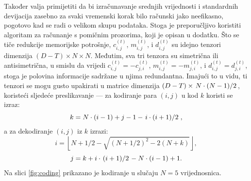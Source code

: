 \documentclass[lmodern, utf8, diplomski, numeric]{fer}
\begin{document}
  Također valja primijetiti da bi izračunavanje srednjih vrijednosti i standardnih devijacija zasebno za svaki vremenski korak bilo računski jako neefikasno, pogotovo kad se radi o velikom skupu podataka.
  Stoga je preporučljivo koristiti algoritam za računanje s pomičnim prozorima, koji je opisan u dodatku.
  Što se tiče redukcije memorijske potrošnje, $c_{i,j}^{\left(t\right)}$, $m_{i,j}^{\left(t\right)}$, i $d_{i,j}^{\left(t\right)}$ su idejno tenzori dimenzija $(D - T) \times N \times N$.
  Međutim, sva tri tenzora su simetrična ili antisimetrična, u smislu da vrijedi $c_{i,j}^{\left(t\right)} = -c_{j,i}^{\left(t\right)}$, $m_{i,j}^{\left(t\right)} = -m_{j,i}^{\left(t\right)}$, i $d_{i,j}^{\left(t\right)} = d_{j,i}^{\left(t\right)}$, stoga je polovina informacije sadržane u njima redundantna.
  Imajući to u vidu, ti tenzori se mogu gusto upakirati u matrice dimenzija $(D - T) \times \left. N\cdot(N - 1) \middle/ 2\right.$, koristeći sljedeće preslikavanje --- za kodiranje para $(i,j)$ u kod $k$ koristi se izraz:
  \begin{equation} k = N \cdot (i - 1) + j - 1 - \left. i \cdot (i + 1) \middle/ 2\right., \end{equation}
  a za dekodiranje $(i, j)$ iz $k$ izrazi:
  \begin{equation} i = \left\lfloor N + 1/2 - \sqrt{(N + 1/2)^2 - 2(N + k)} \right\rfloor, \end{equation}
  \begin{equation} j = k + i \cdot \left.(i + 1) \middle/ 2\right. - N \cdot (i - 1) + 1. \end{equation}
  Na slici \ref{fig:coding} prikazano je kodiranje u slučaju $N = 5$ vrijednosnica.
  
\end{document}
